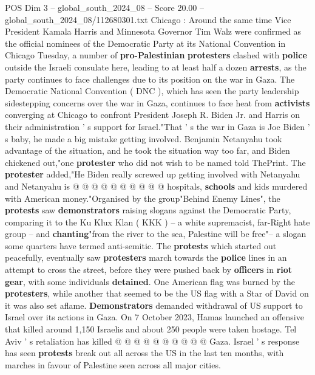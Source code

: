 \begin{textsample}{POS Dim 3 – global\_south\_2024\_08 – Score 20.00 – global\_south\_2024\_08/112680301.txt}  \label{ex:f3_pos_300}
Chicago : Around the same time Vice President Kamala Harris and Minnesota Governor Tim Walz were confirmed as the official nominees of the Democratic Party at its National Convention in Chicago Tuesday, a number of \textbf{pro-Palestinian} \textbf{protesters} clashed with \textbf{police} outside the Israeli consulate here, leading to at least half a dozen \textbf{arrests}, as the party continues to face challenges due to its position on the war in Gaza.
The Democratic National Convention ( DNC ), which has seen the party leadership sidestepping concerns over the war in Gaza, continues to face heat from \textbf{activists} converging at Chicago to confront President Joseph R.
Biden Jr. and Harris on their administration ' s support for Israel."That ' s the war in Gaza is Joe Biden ' s baby, he made a big mistake getting involved.
Benjamin Netanyahu took advantage of the situation, and he took the situation way too far, and Biden chickened out,"one \textbf{protester} who did not wish to be named told ThePrint.
The \textbf{protester} added,"He Biden really screwed up getting involved with Netanyahu and Netanyahu is @ @ @ @ @ @ @ @ @ @ hospitals, \textbf{schools} and kids murdered with American money."Organised by the group"Behind Enemy Lines", the \textbf{protests} saw \textbf{demonstrators} raising slogans against the Democratic Party, comparing it to the Ku Klux Klan ( KKK ) -- a white supremacist, far-Right hate group -- and \textbf{chanting}"from the river to the sea, Palestine will be free"-- a slogan some quarters have termed anti-semitic.
The \textbf{protests} which started out peacefully, eventually saw \textbf{protesters} march towards the \textbf{police} lines in an attempt to cross the street, before they were pushed back by \textbf{officers} in \textbf{riot} \textbf{gear}, with some individuals \textbf{detained}.
One American flag was burned by the \textbf{protesters}, while another that seemed to be the US flag with a Star of David on it was also set aflame. \textbf{Demonstrators} demanded withdrawal of US support to Israel over its actions in Gaza.
On 7 October 2023, Hamas launched an offensive that killed around 1,150 Israelis and about 250 people were taken hostage.
Tel Aviv ' s retaliation has killed @ @ @ @ @ @ @ @ @ @ Gaza.
Israel ' s response has seen \textbf{protests} break out all across the US in the last ten months, with marches in favour of Palestine seen across all major cities.

\end{textsample}
